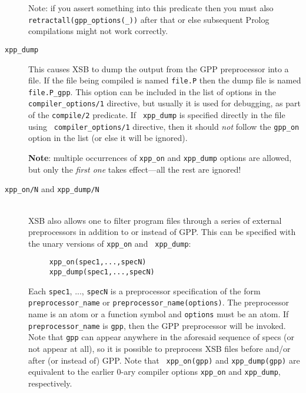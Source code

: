 \begin{description}
  Note: if you assert something into this predicate then you must also {\tt
    retractall(gpp\_options(\_))} after that or else subsequent Prolog
  compilations might not work correctly.
  
\item[{\tt xpp\_dump}] 
  This causes XSB to dump the output from the GPP preprocessor into a file.
  If the file being compiled is named {\tt file.P} then the dump file is
  named {\tt file.P\_gpp}. This option can be included in the list of
  options in the {\tt compiler\_options/1} directive, but usually it is
  used for debugging, as part of the {\tt compile/2} predicate. If {\tt
    xpp\_dump} is specified directly in the file using {\tt
    compiler\_options/1} directive, then it should \emph{not} follow the
  {\tt gpp\_on} option in the list (or else it will be ignored).

  {\bf Note}: multiple occurrences of {\tt xpp\_on} and {\tt xpp\_dump}
  options are allowed, but only the \emph{first one} takes effect---all the
  rest are ignored!  


\item[{\tt xpp\_on/N} and {\tt xpp\_dump/N}]
  ~\\
  XSB also allows one to filter program files through a series of external
  preprocessors in addition to or instead of GPP.
  This can be specified with the unary versions of {\tt xpp\_on} and {\tt
    xpp\_dump}:
\begin{verbatim}
     xpp_on(spec1,...,specN)  
     xpp_dump(spec1,...,specN)  
\end{verbatim}
  Each {\tt spec1}, ..., {\tt specN} is a preprocessor specification of
  the form {\tt preprocessor\_name} or {\tt preprocessor\_name(options)}.
  The preprocessor name is an atom or a function symbol and {\tt options}
  must be an atom. If {\tt preprocessor\_name} is {\tt gpp}, then the GPP
  preprocessor will be invoked. Note that {\tt gpp} can appear anywhere in
  the aforesaid sequence of specs (or not appear at all), so it is possible to preprocess
  XSB files before and/or after (or instead of) GPP. Note that {\tt
    xpp\_on(gpp)}  and {\tt xpp\_dump(gpp)} are equivalent to the earlier
  0-ary compiler options {\tt xpp\_on}
  and {\tt xpp\_dump}, respectively. 


\end{description}
